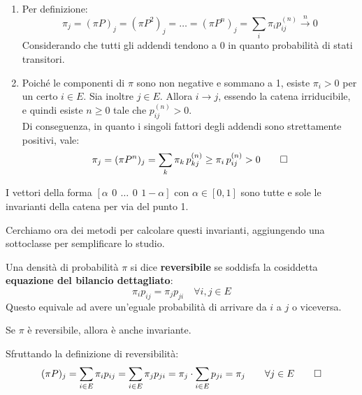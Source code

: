 \begin{dimo}~\\[-25pt]
	\begin{enumerate}
		\item Per definizione:
		$$\pi_j = (\pi P)_j = (\pi P^2)_j = \dots = (\pi P^n)_j = \sum_i \pi_i p_{ij}^{(n)} \xrightarrow{n} 0$$
		Considerando che tutti gli addendi tendono a 0 in quanto probabilità di stati transitori.
		\item Poiché le componenti di $\pi$ sono non negative e sommano a 1, esiste $\pi_i > 0$ per un certo $i \in E$.
		Sia inoltre $j \in E$. Allora $i \to j$, essendo la catena irriducibile,
		e quindi esiste $n \ge 0$ tale che $p_{ij}^{(n)} > 0$. \\
		Di conseguenza, in quanto i singoli fattori degli addendi sono strettamente positivi, vale:
		$$\pi_j = (\pi P^n)_j = \sum_k \pi_k \, p_{kj}^{(n)} \ge \pi_i \, p_{ij}^{(n)} > 0 \qedhere$$
	\end{enumerate}
\end{dimo}
\begin{ese}
	I vettori della forma $[\alpha \ \, 0 \ \, \dots \ \, 0 \ \, 1-\alpha]$ con $\alpha \in [0,1]$ sono tutte
	e sole le invarianti della catena per via del punto 1.
\end{ese}
Cerchiamo ora dei metodi per calcolare questi invarianti, aggiungendo una sottoclasse per semplificare lo studio.

\begin{defn}\label{def-revers}
	Una densità di probabilità $\pi$ si dice \textbf{reversibile} se soddisfa la cosiddetta \textbf{equazione del bilancio dettagliato}:
	$$\pi_i p_{ij} = \pi_j p_{ji} \quad \forall i,j \in E$$
	Questo equivale ad avere un'eguale probabilità di arrivare da $i$ a $j$ o viceversa.
\end{defn}

\begin{teo}
	Se $\pi$ è reversibile, allora è anche invariante.
\end{teo}
\begin{dimo}
	Sfruttando la definizione di reversibilità:
	$$(\pi P)_j = \sum_{i \in E} \pi_i p_{ij} = \sum_{i \in E} \pi_j p_{ji} = \pi_j \cdot \sum_{i \in E} p_{ji} = \pi_j \qquad \forall j \in E \qedhere$$
\end{dimo}

